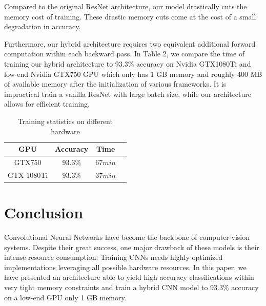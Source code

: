 \documentclass[10pt,twocolumn,letterpaper]{article}
\begin{document}
Compared to the original ResNet architecture, our model drastically cuts the memory cost of training. These drastic memory cuts come at the cost of a small degradation in accuracy.

Furthermore, our hybrid architecture requires two equivalent additional forward computation within each backward pass. In Table 2, we compare the time of training our hybrid architecture to 93.3\% accuracy on Nvidia GTX1080Ti and low-end Nvidia GTX750 GPU which only has 1 GB memory and roughly 400 MB of available memory after the initialization of various frameworks. It is impractical train a vanilla ResNet with large batch size, while our architecture allows for efficient training.
\begin{table}[t]
\centering
\caption{Training statistics on different hardware}
\begin{tabular}{ c c c c}	
 GPU & Accuracy  & Time \\
\hline			
GTX750     & $93.3\%$  & $67 min$    \\
GTX 1080Ti & $93.3\%$  & $37min$  \\
\hline
\end{tabular}
\end{table}

\section{Conclusion} 
Convolutional Neural Networks have become the backbone of computer vision systems. Despite their great success, one major drawback of these models is their intense resource consumption: Training CNNs needs highly optimized implementations leveraging all possible hardware resources. In this paper, we have presented an architecture able to yield high accuracy classifications within very tight memory constraints and train a hybrid CNN model to 93.3\% accuracy on a low-end GPU only 1 GB memory.


{\small


}
\end{document}
